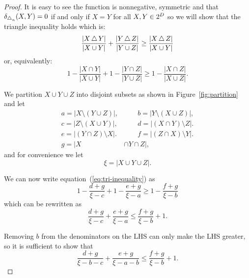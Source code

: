 \begin{proof}
  It is easy to see the function is nonnegative, symmetric and that
  $\delta_{\operatorname{\bigtriangleup}_n}(X,Y)=0$ if and only if $X=Y$ for all $X,Y \in 2^{D}$
  so we will show that the triangle inequality holds which is:
  \begin{equation*}
    \frac{|X \operatorname{\bigtriangleup} Y|}{|X \cup Y|} + \frac{|Y \operatorname{\bigtriangleup} Z|}{|Y \cup Z|} \geq
    \frac{|X \operatorname{\bigtriangleup} Z|}{|X \cup Y|}
  \end{equation*}
  or, equivalently:
  \begin{equation}
    \label{eq:tri-inequality}
    1 - \frac{|X \cap Y|}{|X \cup Y|} +
    1 - \frac{|Y \cap Z|}{|Y \cup Z|} \geq
    1 - \frac{|X \cap Z|}{|X \cup Z|}.
  \end{equation}

  We partition $X \cup Y \cup Z$ into disjoint subsets as shown in
  Figure~\ref{fig:partition} and let
  \begin{align*}
    a = |X \setminus (Y \cup Z)|,&\qquad
    b = |Y \setminus (X \cup Z)|,\\
    c = |Z \setminus (X \cup Y)|,&\qquad
    d = |(X \cap Y) \setminus Z|.\\
    e = |(Y \cap Z) \setminus X|.&\qquad
    f = |(Z \cap X) \setminus Y|.\\
    g = |X& \cap Y \cap Z|,
  \end{align*}
  and for convenience we let
  \begin{equation*}
    \xi  = |X \cup Y \cup Z|.
  \end{equation*}

  We can now write equation~(\ref{eq:tri-inequality}) as
  \begin{equation*}
    1 - \frac{d+g}{\xi -c} + 1 - \frac{e+g}{\xi -a} \geq 1 - \frac{f+g}{\xi -b}
  \end{equation*}
  which can be rewritten as
  \begin{equation*}
    \frac{d+g}{\xi -c} + \frac{e+g}{\xi -a} \leq \frac{f+g}{\xi -b} + 1.
  \end{equation*}

  Removing $b$ from the denominators on the LHS can only make the LHS
  greater, so it is sufficient to show that
  \begin{equation*}
    \frac{d+g}{\xi -b-c} + \frac{e+g}{\xi -a-b} \leq \frac{f+g}{\xi -b} + 1.
  \end{equation*}


\end{proof}

